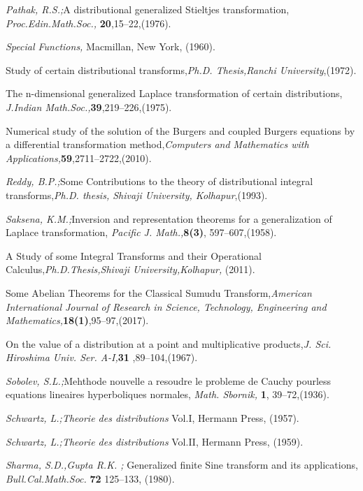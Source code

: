 \begin{thebibliography}{00}
 {\sl Pathak, R.S.;}A distributional generalized Stieltjes transformation, {\it Proc.Edin.Math.Soc.,} {\bf 20},15--22,(1976).

 {\it Special Functions,} Macmillan, New York, (1960).


Study of certain distributional transforms,{\it Ph.D. Thesis,Ranchi University},(1972).

The n-dimensional generalized Laplace transformation of certain distributions, {\it J.Indian Math.Soc.,}{\bf 39},219--226,(1975).

Numerical study of the solution of the Burgers and coupled Burgers equations by a differential transformation method,{\it Computers and Mathematics with Applications,}{\bf 59},2711--2722,(2010).

 {\sl Reddy, B.P.;}Some Contributions to the theory of distributional integral transforms,{\it Ph.D. thesis, Shivaji University, Kolhapur},(1993).

 {\sl Saksena, K.M.;}Inversion and representation theorems for a generalization of
Laplace transformation, {\it Pacific J. Math.,}{\bf 8(3)}, 597--607,(1958).

A Study of some Integral Transforms and their Operational Calculus,{\it Ph.D.Thesis,Shivaji University,Kolhapur,} (2011).

Some Abelian Theorems for the Classical Sumudu Transform,{\it American International Journal of
Research in Science, Technology,
Engineering and Mathematics,}{\bf 18(1)},95--97,(2017).


 On the value of a distribution at a point and multiplicative products,{\it J. Sci. Hiroshima Univ. Ser. A-I,}{\bf 31 },89--104,(1967).

 {\sl Sobolev, S.L.;}Mehthode nouvelle a resoudre le probleme de Cauchy pourless equations lineaires hyperboliques normales, {\it Math. Sbornik,} {\bf 1}, 39--72,(1936).

 {\sl Schwartz, L.;}{\it Theorie des distributions} Vol.I, Hermann Press, (1957).

 {\sl Schwartz, L.;}{\it Theorie des distributions} Vol.II, Hermann Press, (1959).

 {\sl Sharma, S.D.,Gupta R.K. ;} Generalized finite Sine transform and
its applications, {\it Bull.Cal.Math.Soc.} {\bf 72} 125--133, (1980).


\end{thebibliography}
